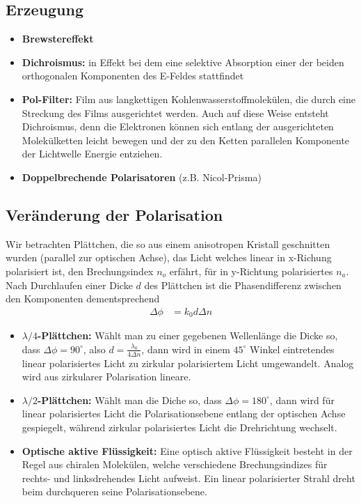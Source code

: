 \documentclass[twocolumn, unnumberedsubsub]{summery_5.0} %
\begin{document}
\subsection{Erzeugung}
\begin{itemize}
    \item {\bf Brewstereffekt}
    \item {\bf Dichroismus:} in Effekt bei dem eine selektive Absorption einer der beiden orthogonalen Komponenten des E-Feldes stattfindet
    \item {\bf Pol-Filter:} Film aus langkettigen Kohlenwasserstoffmolekülen,
    die durch eine Streckung des Films ausgerichtet werden. Auch auf diese Weise entsteht Dichroismus, denn die Elektronen können sich entlang der ausgerichteten Molekülketten leicht bewegen und der zu den Ketten parallelen Komponente der Lichtwelle Energie entziehen.
    \item {\bf Doppelbrechende Polarisatoren} (z.B. Nicol-Prisma)
\end{itemize}

\subsection{Veränderung der Polarisation}
Wir betrachten Plättchen, die so aus einem anisotropen Kristall geschnitten wurden (parallel zur optischen Achse), das Licht welches linear in x-Richung polarisiert ist, den Brechungsindex $n_o$ erfährt, für in y-Richtung polarisiertes $n_a$. Nach Durchlaufen einer Dicke $d$ des Plättchen ist die Phasendifferenz zwischen den Komponenten dementsprechend
\begin{align*}
    \Delta \phi &= k_0 d \Delta n 
\end{align*}
\begin{itemize}
    \item {\bf $\lambda/4$-Plättchen:} Wählt man zu einer gegebenen Wellenlänge die Dicke so, dass $\Delta \phi = 90^\circ$, also $d = \frac{\lambda_0}{4\Delta n}$, dann wird in einem $45^\circ$ Winkel eintretendes linear polarisiertes Licht zu zirkular polarisiertem Licht umgewandelt. Analog wird aus zirkularer Polarisation lineare.
    \item {\bf $\lambda/2$-Plättchen:} Wählt man die Diche so, dass $\Delta \phi=180^\circ$, dann wird für linear polarisiertes Licht die Polarisationsebene entlang der optischen Achse gespiegelt, während  zirkular polarisiertes Licht die Drehrichtung wechselt.
    \item {\bf Optische aktive Flüssigkeit:} Eine optisch aktive Flüssigkeit besteht in der Regel aus chiralen Molekülen, welche verschiedene Brechungsindizes für rechts- und linksdrehendes Licht aufweist. Ein linear polarisierter Strahl dreht beim durchqueren seine Polarisationsebene.    
\end{itemize}
\end{document}

